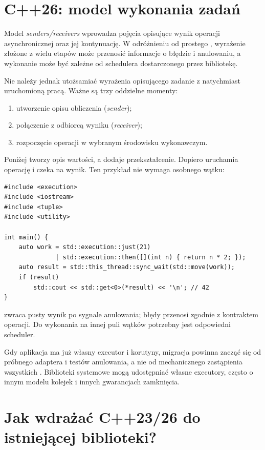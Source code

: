 \section{C++26: model wykonania zadań}

Model \emph{senders/receivers} wprowadza pojęcia opisujące wynik
operacji asynchronicznej oraz jej kontynuację. W odróżnieniu od
prostego , wyrażenie złożone z wielu etapów może
przenosić informacje o błędzie i anulowaniu, a wykonanie może być
zależne od schedulera dostarczonego przez bibliotekę.

Nie należy jednak utożsamiać wyrażenia opisującego zadanie z natychmiast
uruchomioną pracą. Ważne są trzy oddzielne momenty:
\begin{enumerate}
\item utworzenie opisu obliczenia (\emph{sender});
\item połączenie z odbiorcą wyniku (\emph{receiver});
\item rozpoczęcie operacji w wybranym środowisku wykonawczym.
\end{enumerate}

Poniżej  tworzy opis wartości, a  dodaje
przekształcenie. Dopiero  uruchamia
operację i czeka na wynik. Ten przykład nie wymaga osobnego wątku:

\begin{lstlisting}[caption={Opis i uruchomienie prostego zadania (C++26; wymaga <execution>).}]
#include <execution>
#include <iostream>
#include <tuple>
#include <utility>

int main() {
    auto work = std::execution::just(21)
              | std::execution::then([](int n) { return n * 2; });
    auto result = std::this_thread::sync_wait(std::move(work));
    if (result)
        std::cout << std::get<0>(*result) << '\n'; // 42
}
\end{lstlisting}

 zwraca pusty wynik po sygnale anulowania; błędy
przenosi zgodnie z kontraktem operacji. Do wykonania na innej
puli wątków potrzebny jest odpowiedni scheduler.

Gdy aplikacja ma już własny executor i korutyny, migracja powinna
zacząć się od próbnego adaptera i testów anulowania, a nie od
mechanicznego zastąpienia wszystkich . Biblioteki
systemowe mogą udostępniać własne executory, często o innym modelu
kolejek i innych gwarancjach zamknięcia.

\section{Jak wdrażać C++23/26 do istniejącej biblioteki?}
\label{sec:cpp21-migration}

